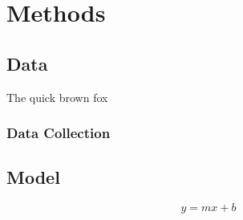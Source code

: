 \chapter{Methods}
\lipsum[6-10]
\section{Data}
\lipsum[11-12]
\begin{table}
  \centering
  \caption{The quick brown fox}
  
\end{table}
\lipsum[13-15]
\subsection{Data Collection}
\lipsum[16-20]
\section{Model}
\lipsum[21]
\begin{equation}
  y = mx + b
\end{equation}
\lipsum[22-25]